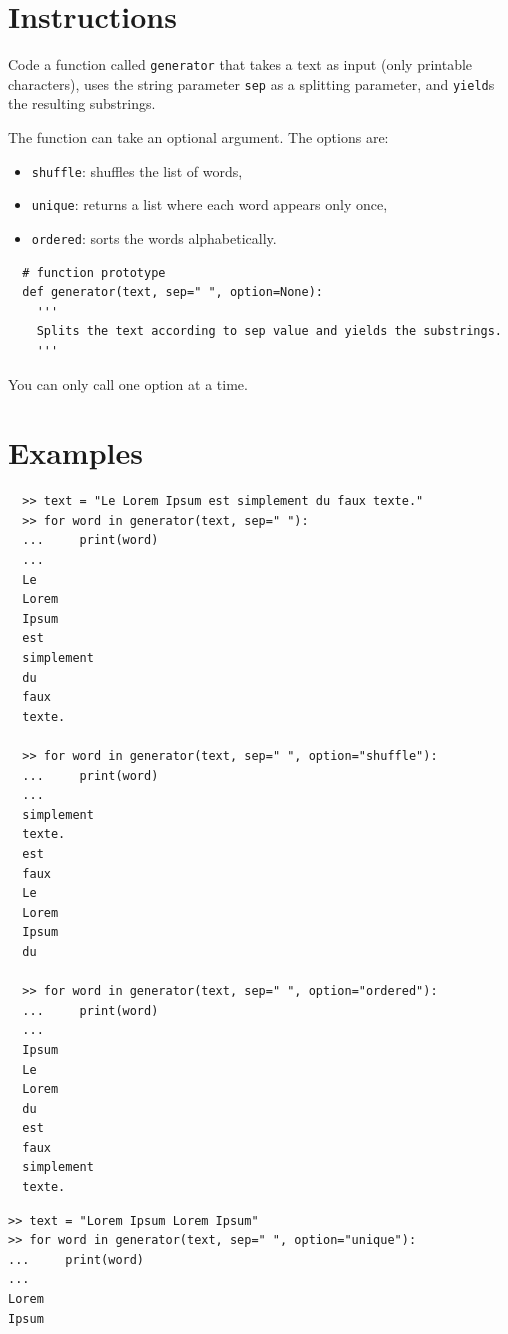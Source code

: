 \documentclass{42-en}
\begin{document}
\section*{Instructions}
Code a function called \texttt{generator} that takes a text as input (only printable characters), uses the string
parameter \texttt{sep} as a splitting parameter, and \texttt{yield}s the resulting substrings.

The function can take an optional argument.
The options are:
\begin{itemize}
  \item \texttt{shuffle}: shuffles the list of words,
  \item \texttt{unique}: returns a list where each word appears only once,
  \item \texttt{ordered}: sorts the words alphabetically.
\end{itemize}

\begin{verbatim}
  # function prototype
  def generator(text, sep=" ", option=None):
    '''
    Splits the text according to sep value and yields the substrings.
    '''
\end{verbatim}

You can only call one option at a time.

\section*{Examples}
\begin{verbatim}
  >> text = "Le Lorem Ipsum est simplement du faux texte."
  >> for word in generator(text, sep=" "):
  ...     print(word)
  ...
  Le
  Lorem
  Ipsum
  est
  simplement
  du
  faux
  texte.

  >> for word in generator(text, sep=" ", option="shuffle"):
  ...     print(word)
  ...
  simplement
  texte.
  est
  faux
  Le
  Lorem
  Ipsum
  du

  >> for word in generator(text, sep=" ", option="ordered"):
  ...     print(word)
  ...
  Ipsum
  Le
  Lorem
  du
  est
  faux
  simplement
  texte.
\end{verbatim}

\begin{verbatim}
>> text = "Lorem Ipsum Lorem Ipsum"
>> for word in generator(text, sep=" ", option="unique"):
...     print(word)
...
Lorem
Ipsum
\end{verbatim}
\end{document}
